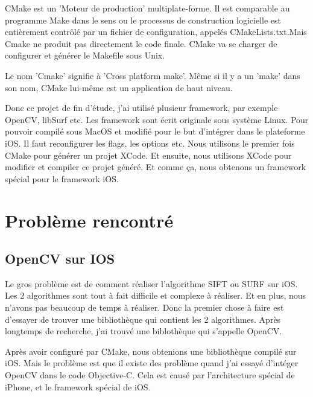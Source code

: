 CMake est un 'Moteur de production' multiplate-forme. Il est comparable au programme Make dans le sens ou le processus de construction logicielle est entièrement contrôlé par un fichier de configuration, appelés CMakeLists.txt.Mais Cmake ne produit pas directement le code finale. CMake va se charger de configurer et générer le Makefile sous Unix. 

Le nom 'Cmake' signifie à 'Cross platform make'. Même si il y a un 'make' dans son nom, CMake lui-même est un application de haut niveau. 

Donc ce projet de fin d'étude, j'ai utilisé plusieur framework, par exemple OpenCV, libSurf etc. Les framework sont écrit originale sous système Linux. Pour pouvoir compilé sous MacOS et modifié pour le but d'intégrer dans le plateforme iOS. Il faut reconfigurer les flags, les options etc. Nous utilisons le premier fois CMake pour générer un projet XCode.  Et ensuite, nous utilisons XCode pour modifier et compiler ce projet généré. Et comme ça, nous obtenons un framework spécial pour le framework iOS.








\section{Problème rencontré} %
\label{sec:bilan_personnel}


\subsection {OpenCV sur IOS}
\label{sec:openv_sur_ios}

Le gros problème est de comment réaliser l'algorithme SIFT ou SURF sur iOS. Les 2 algorithmes sont tout à fait difficile et complexe à réaliser. Et en plus, nous n'avons pas beaucoup de temps à réaliser. Donc la premier chose à faire est d'essayer de trouver une bibliothèque qui contient les 2 algorithmes. Après longtemps de recherche, j'ai trouvé une biblothèque qui s'appelle OpenCV. 

Après avoir configuré par CMake, nous obtenions une bibliothèque compilé sur iOS. Mais le problème est que il existe des problème quand j'ai essayé d'intéger OpenCV dans le code Objective-C. Cela est causé par l'architecture spécial de iPhone, et le framework spécial de iOS.



